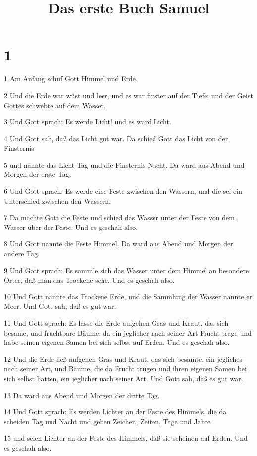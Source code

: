 

\title{Das erste Buch Samuel}


\chapter{1}

\par 1 Am Anfang schuf Gott Himmel und Erde.
\par 2 Und die Erde war wüst und leer, und es war finster auf der Tiefe; und der Geist Gottes schwebte auf dem Wasser.
\par 3 Und Gott sprach: Es werde Licht! und es ward Licht.
\par 4 Und Gott sah, daß das Licht gut war. Da schied Gott das Licht von der Finsternis
\par 5 und nannte das Licht Tag und die Finsternis Nacht. Da ward aus Abend und Morgen der erste Tag.
\par 6 Und Gott sprach: Es werde eine Feste zwischen den Wassern, und die sei ein Unterschied zwischen den Wassern.
\par 7 Da machte Gott die Feste und schied das Wasser unter der Feste von dem Wasser über der Feste. Und es geschah also.
\par 8 Und Gott nannte die Feste Himmel. Da ward aus Abend und Morgen der andere Tag.
\par 9 Und Gott sprach: Es sammle sich das Wasser unter dem Himmel an besondere Örter, daß man das Trockene sehe. Und es geschah also.
\par 10 Und Gott nannte das Trockene Erde, und die Sammlung der Wasser nannte er Meer. Und Gott sah, daß es gut war.
\par 11 Und Gott sprach: Es lasse die Erde aufgehen Gras und Kraut, das sich besame, und fruchtbare Bäume, da ein jeglicher nach seiner Art Frucht trage und habe seinen eigenen Samen bei sich selbst auf Erden. Und es geschah also.
\par 12 Und die Erde ließ aufgehen Gras und Kraut, das sich besamte, ein jegliches nach seiner Art, und Bäume, die da Frucht trugen und ihren eigenen Samen bei sich selbst hatten, ein jeglicher nach seiner Art. Und Gott sah, daß es gut war.
\par 13 Da ward aus Abend und Morgen der dritte Tag.
\par 14 Und Gott sprach: Es werden Lichter an der Feste des Himmels, die da scheiden Tag und Nacht und geben Zeichen, Zeiten, Tage und Jahre
\par 15 und seien Lichter an der Feste des Himmels, daß sie scheinen auf Erden. Und es geschah also.
